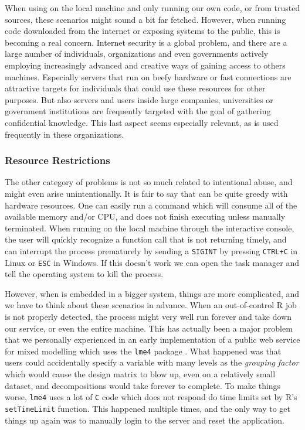 \documentclass[article]{jss}
\begin{document}
When using  on the local machine and only running our own code, or
from trusted sources, these scenarios might sound a bit far fetched. However,
when running code downloaded from the internet or exposing systems to the
public, this is becoming a real concern. Internet security is a global problem,
and there are a large number of individuals, organizations and even governments
actively employing increasingly advanced and creative ways of gaining access to
others machines. Especially servers that run on beefy hardware or fast
connections are attractive targets for individuals that could use these
resources for other purposes. But also servers and users inside large companies,
universities or government institutions are frequently targeted with the goal
of gathering confidential knowledge. This last aspect seems especially
relevant, as  is used frequently in these organizations.

\subsubsection{Resource Restrictions}

The other category of problems is not so much related to intentional abuse, and
might even arise unintentionally. It is fair to say that  can be
quite greedy with hardware resources. One can easily run a command which will
consume all of the available memory and/or CPU, and does not finish executing
unless manually terminated. When running  on the local machine
through the interactive console, the user will quickly recognize a function
call that is not returning timely, and can interrupt the process prematurely by
sending a \texttt{SIGINT} by pressing \texttt{CTRL+C} in Linux or \texttt{ESC}
in Windows. If this doesn't work we can open the task manager and tell the
operating system to kill the process.

However, when  is embedded in a bigger system, things are more
complicated, and we have to think about these scenarios in advance. When an
out-of-control R job is not properly detected, the process might very well run
forever and take down our service, or even the entire machine. This has actually
been a major problem that we personally experienced in an early implementation
of a public web service for mixed modelling \citep{yeroonlme4} which uses the
\texttt{lme4} package \citep{lme4}. What happened was that users could
accidentally specify a variable with many levels as the \emph{grouping factor}
which would cause the design matrix to blow up, even on a relatively small
dataset, and decompositions would take forever to complete. To make things
worse, \texttt{lme4} uses a lot of \texttt{C} code which does not respond do
time limits set by R's \texttt{setTimeLimit} function. This happened multiple
times, and the only way to get things up again was to manually login to the
server and reset the application.
\end{document}
